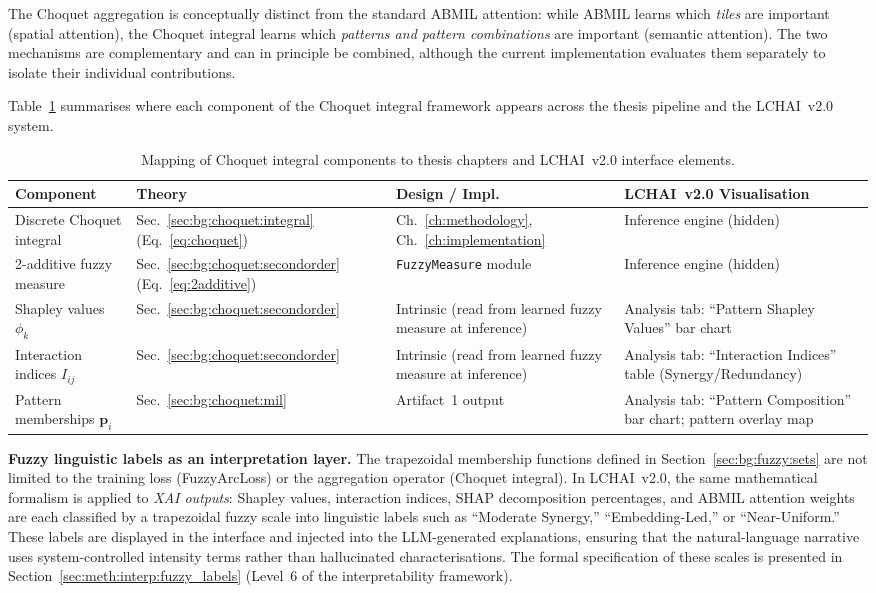 The Choquet aggregation is conceptually distinct from the standard ABMIL attention: while ABMIL learns which \emph{tiles} are important (spatial attention), the Choquet integral learns which \emph{patterns and pattern combinations} are important (semantic attention).
The two mechanisms are complementary and can in principle be combined, although the current implementation evaluates them separately to isolate their individual contributions.

Table~\ref{tab:choquet_pipeline_map} summarises where each component of
the Choquet integral framework appears across the thesis pipeline and
the LCHAI~v2.0 system.

\begin{table}[ht!]
\centering
\small
\caption{Mapping of Choquet integral components to thesis chapters and
LCHAI~v2.0 interface elements.}
\label{tab:choquet_pipeline_map}
\begin{tabular}{p{3.5cm} p{2.5cm} p{2.5cm} p{4.5cm}}
\hline
\textbf{Component} & \textbf{Theory} & \textbf{Design / Impl.} &
\textbf{LCHAI~v2.0 Visualisation} \\
\hline
Discrete Choquet integral &
  Sec.~\ref{sec:bg:choquet:integral} (Eq.~\ref{eq:choquet}) &
  Ch.~\ref{ch:methodology}, Ch.~\ref{ch:implementation} &
  Inference engine (hidden) \\
2-additive fuzzy measure &
  Sec.~\ref{sec:bg:choquet:secondorder} (Eq.~\ref{eq:2additive}) &
  \texttt{FuzzyMeasure} module &
  Inference engine (hidden) \\
Shapley values $\phi_k$ &
  Sec.~\ref{sec:bg:choquet:secondorder} &
  Intrinsic (read from learned fuzzy measure at inference) &
  Analysis tab: ``Pattern Shapley Values'' bar chart \\
Interaction indices $I_{ij}$ &
  Sec.~\ref{sec:bg:choquet:secondorder} &
  Intrinsic (read from learned fuzzy measure at inference) &
  Analysis tab: ``Interaction Indices'' table (Synergy/Redundancy) \\
Pattern memberships $\mathbf{p}_i$ &
  Sec.~\ref{sec:bg:choquet:mil} &
  Artifact~1 output &
  Analysis tab: ``Pattern Composition'' bar chart; pattern overlay map \\
\hline
\end{tabular}
\end{table}

\textbf{Fuzzy linguistic labels as an interpretation layer.}
The trapezoidal membership functions defined in
Section~\ref{sec:bg:fuzzy:sets} are not limited to the training loss
(FuzzyArcLoss) or the aggregation operator (Choquet integral).
In LCHAI~v2.0, the same mathematical formalism is applied to
\emph{XAI outputs}: Shapley values, interaction indices, SHAP
decomposition percentages, and ABMIL attention weights are each
classified by a trapezoidal fuzzy scale into linguistic labels such as
``Moderate Synergy,'' ``Embedding-Led,'' or ``Near-Uniform.''
These labels are displayed in the interface and injected into the
LLM-generated explanations, ensuring that the natural-language
narrative uses system-controlled intensity terms rather than
hallucinated characterisations.
The formal specification of these scales is presented in
Section~\ref{sec:meth:interp:fuzzy_labels} (Level~6 of the
interpretability framework).


